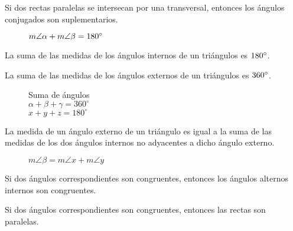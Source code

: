 \begin{theorem}
    Si dos rectas paralelas se intersecan por una transversal, entonces los ángulos conjugados son suplementarios.

\begin{figure}[!h]
    \centering
    
    \caption{$m\angle{\alpha} + m\angle{\beta} = 180^{\circ}$}
    \label{fig:theorem19}
\end{figure}
    
\end{theorem}

\clearpage

\clearpage

\begin{theorem}
    La suma de las medidas de los ángulos internos de un triángulos es $180^{\circ}$.
\end{theorem}

\begin{theorem}
    La suma de las medidas de los ángulos externos de un triángulos es $360^{\circ}$.
\end{theorem}

\begin{figure}[!h]
    \centering
    
    \caption{Suma de ángulos \\ $\alpha + \beta + \gamma = 360^{\circ}$\\$ x + y + z = 180^{\circ}$}
    \label{fig:theorem17}
\end{figure}

\begin{theorem}
    La medida de un ángulo externo de un triángulo es igual a la suma de las medidas de los dos ángulos internos no adyacentes a dicho ángulo externo.

\begin{figure}[!h]
    \centering
    
    \caption{$m\angle{\beta} = m\angle{x} + m\angle{y}$}
    \label{fig:theorem18}
\end{figure}
    
\end{theorem}

\begin{theorem}
    Si dos ángulos correspondientes son congruentes, entonces los ángulos alternos internos son congruentes.
\end{theorem}

\begin{theorem}
    Si dos ángulos correspondientes son congruentes, entonces las rectas son paralelas.
\end{theorem}

